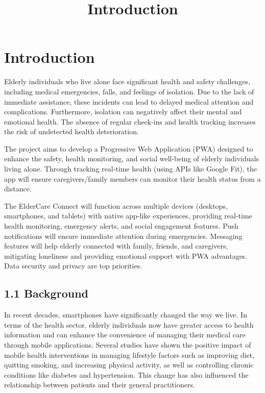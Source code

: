 \documentclass{article}
\title{Introduction}
\begin{document}
\maketitle

\section*{Introduction}

Elderly individuals who live alone face significant health and safety challenges, including medical emergencies, falls, and feelings of isolation. Due to the lack of immediate assistance, these incidents can lead to delayed medical attention and complications. Furthermore, isolation can negatively affect their mental and emotional health. The absence of regular check-ins and health tracking increases the risk of undetected health deterioration.

The project aims to develop a Progressive Web Application (PWA) designed to enhance the safety, health monitoring, and social well-being of elderly individuals living alone. Through tracking real-time health (using APIs like Google Fit), the app will ensure caregivers/family members can monitor their health status from a distance.

The ElderCare Connect will function across multiple devices (desktops, smartphones, and tablets) with native app-like experiences, providing real-time health monitoring, emergency alerts, and social engagement features. Push notifications will ensure immediate attention during emergencies. Messaging features will help elderly connected with family, friends, and caregivers, mitigating loneliness and providing emotional support with PWA advantages. Data security and privacy are top priorities.

\subsection*{1.1 Background}

In recent decades, smartphones have significantly changed the way we live. In terms of the health sector, elderly individuals now have greater access to health information and can enhance the convenience of managing their medical care through mobile applications. Several studies have shown the positive impact of mobile health interventions in managing lifestyle factors such as improving diet, quitting smoking, and increasing physical activity, as well as controlling chronic conditions like diabetes and hypertension. This change has also influenced the relationship between patients and their general practitioners.
\end{document}

